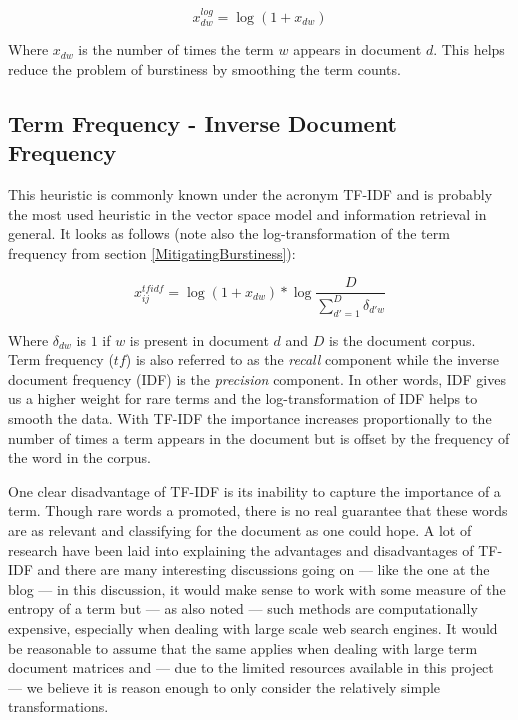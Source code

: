 \[
x_{dw}^{log} = \log{(1 + x_{dw})}
\]

Where $x_{dw}$ is the number of times the term $w$ appears in document
$d$. This helps reduce the problem of burstiness by smoothing  the term
counts.

\subsection{Term Frequency - Inverse Document Frequency\label{TFIDF}}

This heuristic is commonly known under the acronym TF-IDF and is
probably the most used heuristic in the vector space model and
information retrieval in general. It looks as follows (note also the
log-transformation of the term frequency from
section \ref{MitigatingBurstiness}):

\[
x_{ij}^{tfidf} = \log{(1 + x_{dw})} * \log{\frac{D}{\sum_{d\prime = 1}^{D}\delta_{d\prime w}} }
\]

Where $\delta_{dw}$ is $1$ if $w$ is present in document $d$ and $D$
is the document corpus. Term frequency ($\mathit{tf}$) is also referred to as the
\textit{recall} component while the inverse document frequency (IDF)
is the \textit{precision} component. In other words, IDF gives us a
higher weight for rare terms and the log-transformation of IDF helps
to smooth  the data. With TF-IDF the importance increases
proportionally to the number of times a term appears in the document
but is offset by the frequency of the word in the corpus.

One clear disadvantage of TF-IDF is its inability to capture the
importance of a term. Though rare words a promoted, there is no real
guarantee that these words are as relevant and classifying for the
document as one could hope. A lot of research have been laid into
explaining the advantages and disadvantages of TF-IDF and there are
many interesting discussions going on --- like the one at the blog
\cite{UnderstandingTFIDF} --- in this discussion, it would make sense
to work with some measure of the entropy of a term but --- as also
noted --- such methods are computationally expensive, especially when
dealing with large scale web search engines. It would be reasonable to
assume that the same applies when dealing with large term document
matrices and --- due to the limited resources available in this
project --- we believe it is reason enough to only consider the
relatively simple transformations.

